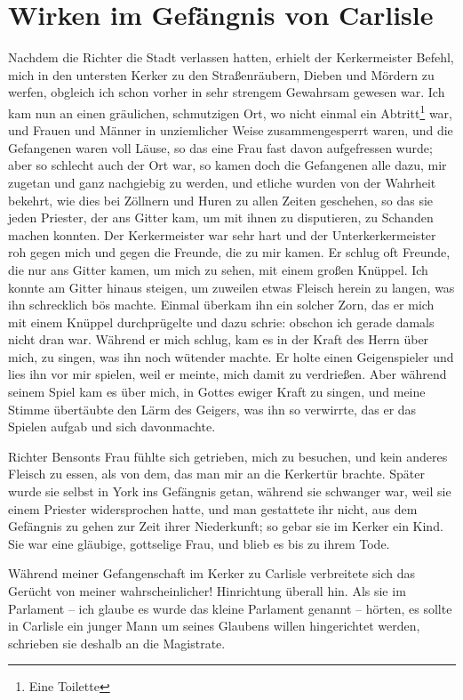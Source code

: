 \section{Wirken im Gefängnis von Carlisle}

Nachdem die Richter die Stadt verlassen hatten, erhielt der
Kerkermeister Befehl, mich in den untersten Kerker zu den 
Straßenräubern, Dieben und Mördern zu werfen, obgleich ich schon 
vorher in sehr strengem Gewahrsam gewesen war. Ich kam nun
an einen gräulichen, schmutzigen Ort, wo nicht einmal 
ein Abtritt\footnote{Eine Toilette}
war, und Frauen und Männer in unziemlicher Weise 
zusammengesperrt waren, und die Gefangenen waren voll Läuse, 
so das eine
Frau fast davon aufgefressen wurde; aber so schlecht auch der
Ort war, so kamen doch die Gefangenen alle dazu, mir zugetan
und ganz nachgiebig zu werden, und etliche wurden von der 
Wahrheit bekehrt, wie dies bei Zöllnern und Huren zu allen Zeiten
geschehen, so das sie jeden Priester, der ans Gitter kam, um mit
ihnen zu disputieren, zu Schanden machen konnten. Der 
Kerkermeister war sehr hart und der 
Unterkerkermeister roh gegen mich und
gegen die Freunde, die zu mir kamen. Er schlug oft Freunde,
die nur ans Gitter kamen, um mich zu sehen, mit einem großen
Knüppel. Ich konnte am Gitter hinaus steigen, um zuweilen etwas
Fleisch herein zu langen, was ihn schrecklich bös machte. Einmal
überkam ihn ein solcher Zorn, das er mich mit einem Knüppel
durchprügelte und dazu schrie:  obschon
ich gerade damals nicht dran war. Während er mich schlug,
kam es in der Kraft des Herrn über mich, zu singen, was ihn
noch wütender machte. Er holte einen 
Geigenspieler und lies
ihn vor mir spielen, weil er meinte, mich damit zu verdrießen.
Aber während seinem Spiel kam es über mich, in Gottes ewiger
Kraft zu singen, und meine Stimme übertäubte den Lärm des
Geigers, was ihn so verwirrte, das er das Spielen aufgab und
sich davonmachte.


Richter Bensonts Frau fühlte sich getrieben, mich zu besuchen,
und kein anderes Fleisch zu essen, als von dem, das man mir
an die Kerkertür brachte. Später wurde sie selbst in York ins
Gefängnis getan, während sie schwanger war, weil sie einem
Priester widersprochen hatte, und man gestattete ihr nicht, aus
dem Gefängnis zu gehen zur Zeit ihrer Niederkunft; so gebar
sie im Kerker ein Kind. Sie war eine gläubige, gottselige Frau,
und blieb es bis zu ihrem Tode.


Während meiner Gefangenschaft im Kerker zu Carlisle 
verbreitete sich das Gerücht von meiner wahrscheinlicher! Hinrichtung
überall hin. Als sie im Parlament -- ich glaube es wurde das
kleine Parlament genannt -- hörten, es sollte in Carlisle ein
junger Mann um seines Glaubens willen hingerichtet werden,
schrieben sie deshalb an die Magistrate.


